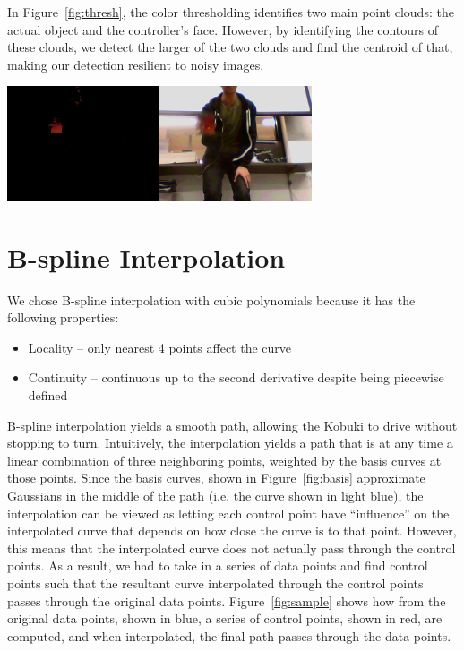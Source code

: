 \documentclass[10pt]{article}
\newenvironment{Figure}
  {\par\medskip\noindent\minipage{\linewidth}}
  {\endminipage\par\medskip}
\begin{document}
\begin{multicols*}{2}
  In Figure~\ref{fig:thresh}, the color thresholding identifies two main point
  clouds: the actual object and the controller's face. However, by identifying
  the contours of these clouds, we detect the larger of the two clouds and find
  the centroid of that, making our detection resilient to noisy images.
  \begin{Figure}
    \includegraphics[width=9cm]{../thresh_img/detect5.png}
     \label{fig:thresh}
  \end{Figure}

  \section*{B-spline Interpolation}
  We chose B-spline interpolation with cubic polynomials because it has the
  following properties: \cite{fuhuacheng2012}
  \begin{itemize}
    \item Locality -- only nearest 4 points affect the curve
    \item Continuity -- continuous up to the second derivative despite being
      piecewise defined
  \end{itemize}
  B-spline interpolation yields a smooth path, allowing the Kobuki to drive
  without stopping to turn. Intuitively, the interpolation yields a path that is
  at any time a linear combination of three neighboring points, weighted by the
  basis curves at those points. Since the basis curves, shown in
  Figure~\ref{fig:basis} approximate Gaussians in the middle of the path (i.e.
  the curve shown in light blue), the interpolation can be viewed as letting
  each control point have ``influence'' on the interpolated curve that depends
  on how close the curve is to that point. However, this means that the
  interpolated curve does not actually pass through the control points. As a
  result, we had to take in a series of data points and find control points such
  that the resultant curve interpolated through the control points passes
  through the original data points. Figure~\ref{fig:sample} shows how from the
  original data points, shown in blue, a series of control points, shown in red,
  are computed, and when interpolated, the final path passes through the data
  points.


\end{multicols*}
\end{document}
